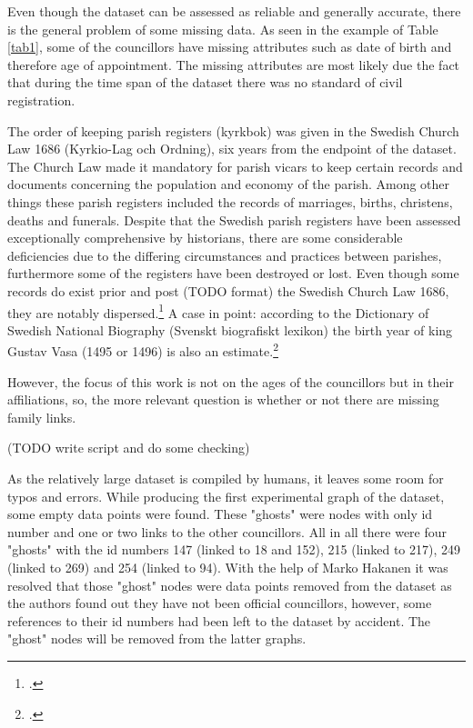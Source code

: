 Even though the dataset can be assessed as reliable and generally accurate, there is the general problem of some missing data. As seen in the example of Table \ref{tab1}, some of the councillors have missing attributes such as date of birth and therefore age of appointment. The missing attributes are most likely due the fact that during the time span of the dataset there was no standard of civil registration. 

The order of keeping parish registers (kyrkbok) was given in the Swedish Church Law 1686 (Kyrkio-Lag och Ordning), six years from the endpoint of the dataset. The Church Law made it mandatory for parish vicars to keep certain records and documents concerning the population and economy of the parish. Among other things these parish registers included the records of marriages, births, christens, deaths and funerals. Despite that the Swedish parish registers have been assessed exceptionally comprehensive by historians, there are some considerable deficiencies due to the differing circumstances and practices between parishes, furthermore some of the registers have been destroyed or lost. Even though some records do exist prior and post (TODO format) the Swedish Church Law 1686, they are notably dispersed.\footcite[p. 169-176.]{viikki94} A case in point: according to the Dictionary of Swedish National Biography (Svenskt biografiskt lexikon) the birth year of king Gustav Vasa (1495 or 1496) is also an estimate.\footcite{sbl_gustav_v} 

However, the focus of this work is not on the ages of the councillors but in their affiliations, so, the more relevant question is whether or not there are missing family links. 

(TODO write script and do some checking)

As the relatively large dataset is compiled by humans, it leaves some room for typos and errors. While producing the first experimental graph of the dataset, some empty data points were found. These "ghosts" were nodes with only id number and one or two links to the other councillors. All in all there were four "ghosts" with the id numbers 147 (linked to 18 and 152), 215 (linked to 217), 249 (linked to 269) and 254 (linked to 94). With the help of Marko Hakanen it was resolved that those "ghost" nodes were data points removed from the dataset as the authors found out they have not been official councillors, however, some references to their id numbers had been left to the dataset by accident. The "ghost" nodes will be removed from the latter graphs.

